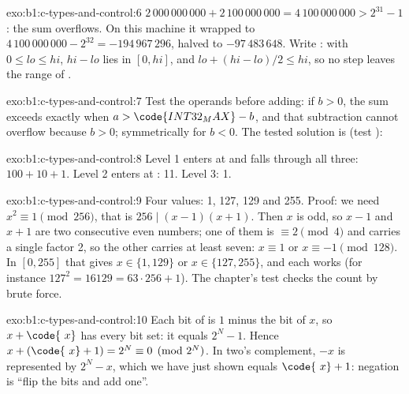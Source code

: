 \begin{solution}{exo:b1:c-types-and-control:6}
$2\,000\,000\,000 + 2\,100\,000\,000 = 4\,100\,000\,000 > 2^{31} - 1$: the sum overflows. On this machine it wrapped to
$4\,100\,000\,000 - 2^{32} = -194\,967\,296$, halved to $-97\,483\,648$. Write : with
$0 \leq lo \leq hi$, $hi - lo$ lies in $[0, hi]$, and $lo + (hi-lo)/2 \leq hi$, so no step leaves the range of
.
\end{solution}

\begin{solution}{exo:b1:c-types-and-control:7}
Test the operands before adding: if $b > 0$, the sum exceeds  exactly when
$a > \code{INT32_MAX} - b$, and that subtraction cannot overflow because $b > 0$; symmetrically for $b < 0$. The
tested solution is  (test ):
\end{solution}

\begin{solution}{exo:b1:c-types-and-control:8}
Level 1 enters at  and falls through all three: $100 + 10 + 1$. Level 2 enters at : 11.
Level 3: 1.
\end{solution}

\begin{solution}{exo:b1:c-types-and-control:9}
Four values: 1, 127, 129 and 255. Proof: we need $x^2 \equiv 1 \pmod{256}$, that is $256 \mid (x-1)(x+1)$. Then $x$ is
odd, so $x - 1$ and $x + 1$ are two consecutive even numbers; one of them is $\equiv 2 \pmod 4$ and carries a single
factor 2, so the other carries at least seven: $x \equiv 1$ or $x \equiv -1 \pmod{128}$. In $[0, 255]$ that gives
$x \in \{1, 129\}$ or $x \in \{127, 255\}$, and each works (for instance $127^2 = 16129 = 63 \cdot 256 + 1$). The
chapter's test  checks the count by brute force.
\end{solution}

\begin{solution}{exo:b1:c-types-and-control:10}
Each bit of  is $1$ minus the bit of $x$, so $x + \code{~x}$ has every bit set: it equals $2^N - 1$. Hence
$x + (\code{~x} + 1) = 2^N \equiv 0 \pmod{2^N}$. In two's complement, $-x$ is represented by $2^N - x$, which we have
just shown equals $\code{~x} + 1$: negation is ``flip the bits and add one''.
\end{solution}

